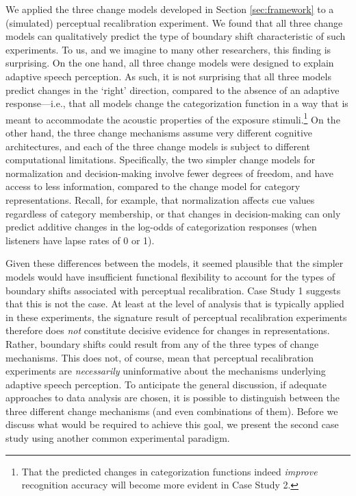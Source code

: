 \documentclass[
  11pt,
  man,floatsintext]{apa6}
\begin{document}
We applied the three change models developed in Section \ref{sec:framework} to a (simulated) perceptual recalibration experiment. We found that all three change models can qualitatively predict the type of boundary shift characteristic of such experiments. To us, and we imagine to many other researchers, this finding is surprising. On the one hand, all three change models were designed to explain adaptive speech perception. As such, it is not surprising that all three models predict changes in the `right' direction, compared to the absence of an adaptive response---i.e., that all models change the categorization function in a way that is meant to accommodate the acoustic properties of the exposure stimuli.\footnote{That the predicted changes in categorization functions indeed \emph{improve} recognition accuracy will become more evident in Case Study 2.} On the other hand, the three change mechanisms assume very different cognitive architectures, and each of the three change models is subject to different computational limitations. Specifically, the two simpler change models for normalization and decision-making involve fewer degrees of freedom, and have access to less information, compared to the change model for category representations. Recall, for example, that normalization affects cue values regardless of category membership, or that changes in decision-making can only predict additive changes in the log-odds of categorization responses (when listeners have lapse rates of 0 or 1).

Given these differences between the models, it seemed plausible that the simpler models would have insufficient functional flexibility to account for the types of boundary shifts associated with perceptual recalibration. Case Study 1 suggests that this is not the case. At least at the level of analysis that is typically applied in these experiments, the signature result of perceptual recalibration experiments therefore does \emph{not} constitute decisive evidence for changes in representations. Rather, boundary shifts could result from any of the three types of change mechanisms. This does not, of course, mean that perceptual recalibration experiments are \emph{necessarily} uninformative about the mechanisms underlying adaptive speech perception. To anticipate the general discussion, if adequate approaches to data analysis are chosen, it is possible to distinguish between the three different change mechanisms (and even combinations of them). Before we discuss what would be required to achieve this goal, we present the second case study using another common experimental paradigm.
\end{document}
